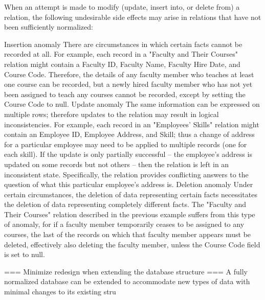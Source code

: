 \documentclass[12pt,a4paper]{report}
\begin{document}
When an attempt is made to modify (update, insert into, or delete from) a relation, the following undesirable side effects may arise in relations that have not been sufficiently normalized:

Insertion anomaly
There are circumstances in which certain facts cannot be recorded at all. For example, each record in a "Faculty and Their Courses" relation might contain a Faculty ID, Faculty Name, Faculty Hire Date, and Course Code. Therefore, the details of any faculty member who teaches at least one course can be recorded, but a newly hired faculty member who has not yet been assigned to teach any courses cannot be recorded, except by setting the Course Code to null.
Update anomaly
The same information can be expressed on multiple rows; therefore updates to the relation may result in logical inconsistencies. For example, each record in an "Employees' Skills" relation might contain an Employee ID, Employee Address, and Skill; thus a change of address for a particular employee may need to be applied to multiple records (one for each skill). If the update is only partially successful – the employee's address is updated on some records but not others – then the relation is left in an inconsistent state. Specifically, the relation provides conflicting answers to the question of what this particular employee's address is.
Deletion anomaly
Under certain circumstances, the deletion of data representing certain facts necessitates the deletion of data representing completely different facts. The "Faculty and Their Courses" relation described in the previous example suffers from this type of anomaly, for if a faculty member temporarily ceases to be assigned to any courses, the last of the records on which that faculty member appears must be deleted, effectively also deleting the faculty member, unless the Course Code field is set to null.


=== Minimize redesign when extending the database structure ===
A fully normalized database can be extended to accommodate new types of data with minimal changes to its existing stru
\end{document}
